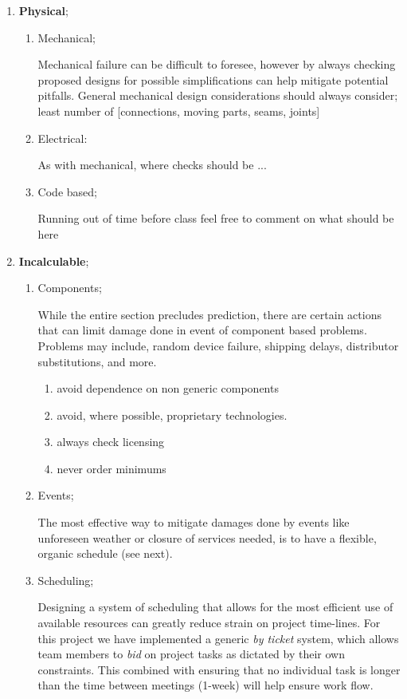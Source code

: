 \begin{enumerate}
\begin{enumerate}
  \end{enumerate} 
  \item \textbf{Physical};
  \begin{enumerate}
  \item Mechanical; 
  
  Mechanical failure can be difficult to foresee, however by always checking proposed designs for possible simplifications can help mitigate potential pitfalls. General mechanical design considerations should always consider; least number of [connections, moving parts, seams, joints]
  \item Electrical:
  
  As with mechanical, where checks should be ...
  \item Code based;
  
  Running out of time before class  feel free to comment on what should be here
  \end{enumerate}
  \item \textbf{Incalculable}; 
  \begin{enumerate}
  \item Components;
  
  While the entire section precludes prediction, there are certain actions that can limit damage done in event of component based problems. Problems may include, random device failure, shipping delays, distributor substitutions, and more.
  \begin{enumerate}
  \item avoid dependence on non generic components
  \item avoid, where possible, proprietary technologies.
  \item always check licensing 
  \item never order minimums
  \end{enumerate}
  \item Events;
  
  The most effective way to mitigate damages done by events like unforeseen weather or closure of services needed, is to have a flexible, organic schedule (see next).
  \item Scheduling;
  
  Designing a system of scheduling that allows for the most efficient use of available resources can greatly reduce strain on project time-lines. For this project we have implemented a generic \textit{by ticket} system, which allows team members to \textit{bid} on project tasks as dictated by their own constraints. This combined with ensuring that no individual task is longer than the time between meetings (1-week) will help ensure work flow. 
  \end{enumerate}
  \end{enumerate}
 

